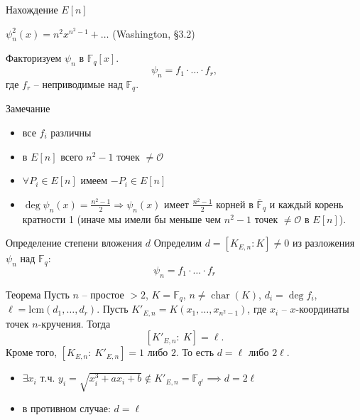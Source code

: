 \documentclass{beamer}
\begin{document}
\begin{frame}{Нахождение $E[n]$}
    \begin{center}
       $\psi_n^2(x) = {n^2}{x^{{n^2} - 1}} +  \ldots$ \hfill {\small(Washington, \S3.2)}
       
    \end{center}

Факторизуем $\psi_n$ в $\mathbb{F}_q[x]$.
\[\psi_n = f_1 \cdot \ldots \cdot f_r,\]
где $f_r$ -- неприводимые над $\mathbb{F}_q$.
\begin{block}{Замечание}
\begin{itemize}
    \item все $f_i$ различны
    \item в $E[n]$ всего ${n^2} - 1$ точек $\neq \mathcal{O}$
    \item $\forall P_i \in E[n]$ имеем $-P_i \in E[n]$
    \item $\deg {\psi _n}( x ) = \frac{{{n^2} - 1}}{2} \Rightarrow {\psi _n}( x )$ имеет $\frac{{{n^2} - 1}}{2}$ корней в $\overline{\mathbb{F}}_q$ и каждый корень кратности 1 (иначе мы имели бы меньше чем ${n^2} - 1$ точек $ \ne \mathcal{O}$ в $E[n]$). 
\end{itemize}
\end{block}
\end{frame}

\begin{frame}{Определение степени вложения $d$}
Определим $d = [K_{E,n} : K] \ne 0$ из разложения $\psi_n$ над $\mathbb{F}_q$: 
\[\psi_n = f_1 \cdot \ldots \cdot f_r\]
\begin{block}{Теорема}
Пусть $n$ -- простое $> 2$, $K = \mathbb{F}_q$, $n \ne \operatorname{char}(K)$,
$d_i = \deg {f_i}$,
$\ell = \mathrm{lcm}(d_1, \ldots, d_r)$.
Пусть $K'_{E,n} = K( {{x_1}, \ldots, {x_{{n^2} - 1}}})$, где ${x_i}$ -- $x$-координаты точек $n$-кручения. Тогда 
    \[[ {K'_{E,n}:\:K} ] = \ell.
    \]
    Кроме того, $[ {{K_{E,n}}:\:K'_{E,n}} ] = 1$ либо $2$. То есть $d = \ell$ либо $2\ell$. 
\end{block}

\begin{itemize}
    \item $\exists x_i$ т.ч. $y_i = \sqrt{x_i^3 + a x_i + b} \not\in K'_{E,n} = \mathbb{F}_{q^\ell} \implies d = 2 \ell$
    \item в противном случае: $d = \ell$  
\end{itemize}
\end{frame}
\end{document}
